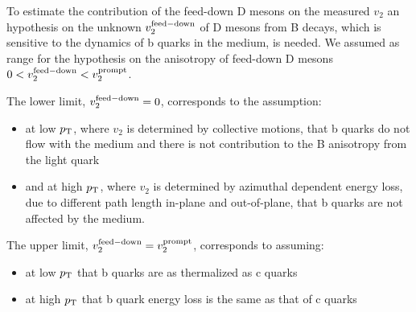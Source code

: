 To estimate the contribution of the feed-down D mesons on the measured $v_2$ 
an hypothesis on the unknown $v_2^{\rm feed-down}$ of D mesons from B decays, 
which is sensitive to the dynamics of b quarks in the medium, is needed.
We assumed as range for the hypothesis on 
the anisotropy of feed-down D mesons $0<v_2^{\rm feed-down}<v_2^{\rm prompt}$.

The lower limit, $v_2^{\rm feed-down}=0$, corresponds to the assumption:
\begin{itemize}
\item{at low $p_{\rm T}$, where $v_2$ is determined by collective motions, 
that b quarks do not flow with the medium and there is not contribution to 
the B anisotropy from the light quark}
\item{and at high $p_{\rm T}$, where $v_2$ is determined by azimuthal dependent 
energy loss, due to different path length in-plane and out-of-plane, that
b quarks are not affected by the medium.}
\end{itemize}

The upper limit, $v_2^{\rm feed-down}=v_2^{\rm prompt}$, corresponds to assuming:
\begin{itemize}
\item{at low $p_{\rm T}$ that b quarks are as thermalized as c quarks}
\item{at high $p_{\rm T}$ that b quark energy loss is the same as that of c quarks}
\end{itemize}


